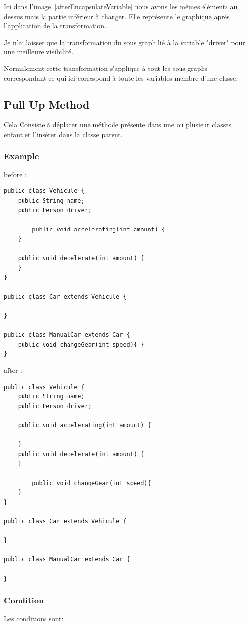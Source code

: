 \documentclass[a4paper, 10pt]{article}
\begin{document}
Ici dans l'image~\ref{afterEncapsulateVariable} nous avons les mêmes éléments au dessus mais la partie inférieur à changer. 
Elle représente le graphique après l'application de la transformation.

Je n'ai laisser que la transformation du sous graph lié à la variable "driver" pour une meilleure visibilité. 

Normalement cette transformation s'applique à tout les sous graphs correspondant ce qui ici correspond à toute les variables membre d'une classe.

\subsection{Pull Up Method}

Cela Consiste à déplacer une méthode présente dans une ou plusieur classes enfant et l'insérer dans la classe parent.

\subsubsection{Example}

before :
\begin{lstlisting}[frame=single]
public class Vehicule {
	public String name;
	public Person driver;

        public void accelerating(int amount) { 
	}

	public void decelerate(int amount) { 
	}
}

public class Car extends Vehicule {

}

public class ManualCar extends Car {
	public void changeGear(int speed){ }
}
\end{lstlisting}

after :
\begin{lstlisting}[frame=single]
public class Vehicule {
	public String name;
	public Person driver;

	public void accelerating(int amount) {

	}
	public void decelerate(int amount) { 
	}

        public void changeGear(int speed){
	}
}

public class Car extends Vehicule {

}

public class ManualCar extends Car {

}
\end{lstlisting}
\subsubsection{Condition}
Les conditions sont:
\end{document}

